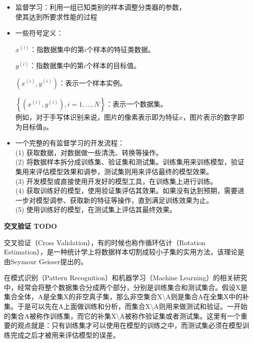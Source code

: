\documentclass[10pt,a4paper]{ctexbook}
\begin{document}
\begin{itemize}
\item 监督学习：利用一组已知类别的样本调整分类器的参数，\\使其达到所要求性能的过程
\item 一些符号定义：

$x^{(i)}$：指数据集中的第$i$个样本的特征类数据。

$y^{(i)}$：指数据集中的第$i$个样本的目标值。

$\left(x^{(i)},y^{(i)}\right)$：表示一个样本实例。

$\left\{\left(x^{(i)},y^{(i)}\right), i=1,...,N\right\}$：表示一个数据集。
\\例如，对于手写体识别来说，图片的像素表示即为特征$x$，图片表示的数字即为目标值$y$。

\end{itemize}

\begin{itemize}
\item 一个完整的有监督学习的开发流程：
\\(1) 获取数据，对数据做一些清洗、转换等操作。
\\(2) 将数据样本拆分成训练集、验证集和测试集。训练集用来训练模型，验证集用来评估模型效果和调参，测试集则用来评估最终的模型效果。
\\(3) 开发模型或直接使用开发好的模型工具，在训练集上进行训练。
\\(4) 获取训练好的模型，使用验证集评估其效果。如果没有达到预期，需要进一步对模型调参、获取新的特征等操作，直到满足训练效果为止。
\\(5) 使用训练好的模型，在测试集上评估其最终效果。
\end{itemize}

\textbf{交叉验证{\color{red} TODO}}

交叉验证（Cross Validation），有的时候也称作循环估计（Rotation Estimation），是一种统计学上将数据样本切割成较小子集的实用方法，该理论是由Seymour Geisser提出的。

在模式识别（Pattern Recognition）和机器学习（Machine Learning）的相关研究中，经常会将整个数据集合分成两个部分，分别是训练集合和测试集合。假设X是集合全体，A是全集X的非空真子集，那么非空集合X\textbackslash{A}则是集合A在全集X中的补集。于是可以先在A上面做训练和分析，而集合X\textbackslash{A}则用来做测试和验证。一开始的集合A被称作训练集，而它的补集X\textbackslash{A}被称作验证集或者测试集。这里有一个重要的观点就是：只有训练集才可以使用在模型的训练之中，而测试集必须在模型训练完成之后才被用来评估模型的误差。
\end{document}
